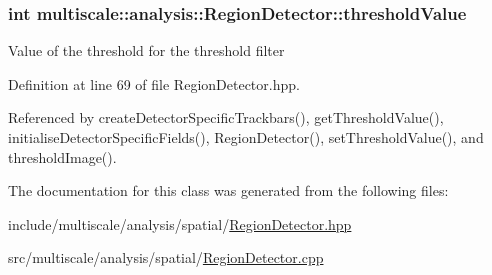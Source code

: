 \hypertarget{classmultiscale_1_1analysis_1_1RegionDetector_a0f7469d124c0b906d199e00ea5713007}{
\subsubsection[{threshold\-Value}]{\setlength{\rightskip}{0pt plus 5cm}int multiscale\-::analysis\-::\-Region\-Detector\-::threshold\-Value\hspace{0.3cm}{\ttfamily [private]}}}\label{classmultiscale_1_1analysis_1_1RegionDetector_a0f7469d124c0b906d199e00ea5713007}
Value of the threshold for the threshold filter 

Definition at line 69 of file Region\-Detector.\-hpp.



Referenced by create\-Detector\-Specific\-Trackbars(), get\-Threshold\-Value(), initialise\-Detector\-Specific\-Fields(), Region\-Detector(), set\-Threshold\-Value(), and threshold\-Image().



The documentation for this class was generated from the following files\-:\begin{DoxyCompactItemize}
\item 
include/multiscale/analysis/spatial/\hyperlink{RegionDetector_8hpp}{Region\-Detector.\-hpp}\item 
src/multiscale/analysis/spatial/\hyperlink{RegionDetector_8cpp}{Region\-Detector.\-cpp}\end{DoxyCompactItemize}
